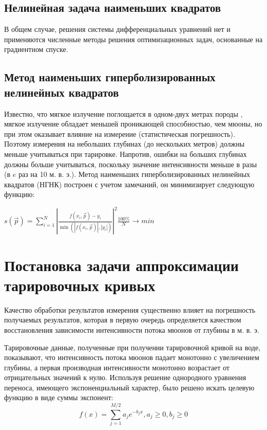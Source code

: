 \subsection{Нелинейная задача наименьших квадратов}


В общем случае, решения системы дифференциальных уравнений нет и 
применяются численные методы решения оптимизационных задач, 
основанные на градиентном спуске.

\subsection[Метод наименьших гиперболизированных \\нелинейных  квадратов]{Метод наименьших гиперболизированных \\ нелинейных  квадратов}
Известно, что  мягкое излучение поглощается в одном-двух метрах породы \cite{cosmicrays}, мягкое излучение обладает
меньшей проникающей способностью, чем мюоны, но при этом оказывает влияние на измерение (статистическая погрешность).
Поэтому измерения на небольших глубинах (до нескольких метров) должны меньше учитываться при тарировке. 
Напротив, ошибки на больших глубинах должны больше учитываться, поскольку значение интенсивности  меньше в разы
(в $e$ раз на 10 м. в. э.). Метод наименьших гиперболизированных нелинейных  квадратов (НГНК) построен с учетом замечаний, он минимизирует следующую функцию: 

\begin{center}
$s(\vec{p}) = \displaystyle\sum_{i=1}^N \left|
\frac{f(x_i, \vec{p}) - y_i}{\min(\left|f(x_i, \vec{p})\right|, \left|y_i\right|)}\right|^2 
\frac{100\%}{N} \rightarrow min$ %
 
\end{center}


\section[Постановка задачи аппроксимации тарировочных кривых]{Постановка задачи аппроксимации \\ тарировочных кривых}\label{sect2_2}

Качество обработки результатов измерения существенно влияет на погрешность
получаемых результатов, которая в первую очередь определяется
качеством восстановления зависимости интенсивности потока мюонов от глубины в м. в. э.

Тарировочные данные, полученные при получении тарировочной кривой на воде, 
показывают, что интенсивность потока мюонов падает монотонно с увеличением
глубины, а первая производная интенсивности монотонно возрастает 
от отрицательных значений к нулю. Используя решение 
однородного уравнения переноса, имеющего экспоненциальный характер, было решено
искать целевую функцию в виде суммы экспонент:
\begin{equation}
  \label{eq:approximation}
  \mathit{ f(x)  = \displaystyle\sum_{j=1}^{M/2} a_j e^{-b_j x} , a_j \geq 0 , b_j \geq 0  }  
\end{equation}



